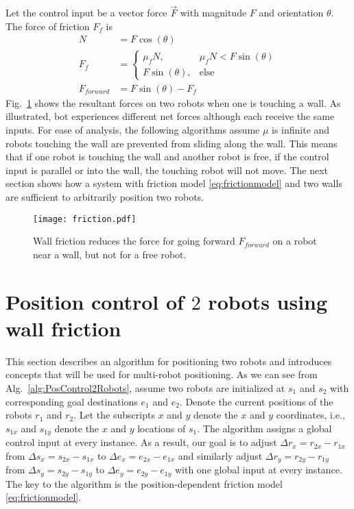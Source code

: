  Let the control input be a vector force $\vec{F}$ with magnitude $F$ and orientation $\theta$.  The force of friction $F_f$ is
\begin{align}
N &= F \cos(\theta) \nonumber\\
F_f &= \begin{cases}  \mu_f N, &  \mu_f N < F \sin(\theta)  \label{eq:frictionmodel} \\ 
F \sin(\theta), & \text{else} \end{cases}  \\%
F_{forward} &=  F \sin(\theta) - F_f  \nonumber
\end{align}
 Fig.~\ref{fig:friction} shows the resultant forces on two robots when one is touching a wall. As illustrated, bot experiences different net forces although each receive the same inputs.
  For ease of analysis, the following algorithms assume $\mu$ is infinite and robots touching the wall are prevented from sliding along the wall.
This means that if one robot is touching the wall and another robot is free, if the control input is parallel or into the wall, the touching robot will not move. 
The next section shows how a system with friction model \eqref{eq:frictionmodel} and two walls are sufficient to arbitrarily position two robots. 
\begin{figure}[h]
\begin{center}
\texttt{[image: friction.pdf]} 
\caption{Wall friction reduces the force for going forward $F_{forward}$ on a robot near a wall, but not for a free robot.}
\label{fig:friction}
\end{center}
\end{figure} 




\section{Position control of $2$ robots using wall friction}\label{sec:PostionControl2Robots}
This section describes an algorithm for positioning two robots and introduces concepts that will be used for multi-robot positioning.
As we can see from Alg.~\ref{alg:PosControl2Robots}, assume two robots are initialized at $s_1$ and $s_2$ with corresponding goal destinations $e_1$ and $e_2$. 
Denote the current positions of the robots  $r_1$ and $r_2$. 
Let the subscripts $x$ and $y$ denote the $x$ and $y$ coordinates, i.e., $s_{1x}$ and $s_{1y}$ denote the $x$ and $y$ locations of $s_1$. 
The algorithm assigns a global control input at every instance.
 As a result, our goal is to adjust 
 $\Delta r_x = r_{2x}-r_{1x}$ from $\Delta s_x = s_{2x}-s_{1x}$ to $\Delta e_x = e_{2x}-e_{1x}$ and similarly adjust 
 $\Delta r_y = r_{2y}-r_{1y}$ from $\Delta s_y = s_{2y}-s_{1y}$ to $\Delta e_y = e_{2y}-e_{1y}$ with one global input at every instance. 
 The key to the algorithm is the position-dependent friction model \eqref{eq:frictionmodel}.

